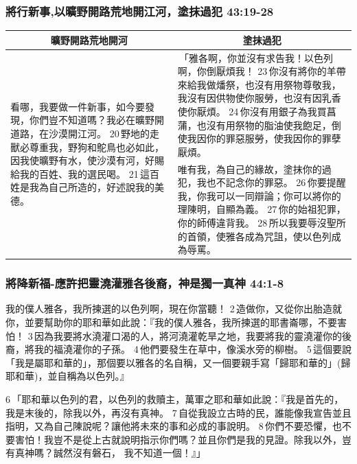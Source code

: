 \subsubsection{將行新事,以曠野開路荒地開江河，塗抹過犯 43:19-28}
\begin{table}[H]
\centering
\begin{tabular}{p{5.75cm}|p{11.50cm}}\hline\hline
\multicolumn{1}{c|}{曠野開路荒地開河}&\multicolumn{1}{c}{塗抹過犯}\\\hline
\multirow{2}{6.cm}{看哪，我要做一件新事，如今要發現，你們豈不知道嗎？我必在曠野開道路，在沙漠開江河。 20 野地的走獸必尊重我，野狗和鴕鳥也必如此，因我使曠野有水，使沙漠有河，好賜給我的百姓、我的選民喝。 21 這百姓是我為自己所造的，好述說我的美德。}
& 「雅各啊，你並沒有求告我！以色列啊，你倒厭煩我！ 23 你沒有將你的羊帶來給我做燔祭，也沒有用祭物尊敬我，我沒有因供物使你服勞，也沒有因乳香使你厭煩。 24 你沒有用銀子為我買菖蒲，也沒有用祭物的脂油使我飽足，倒使我因你的罪惡服勞，使我因你的罪孽厭煩。\\\cline{2-2}
&唯有我，為自己的緣故，塗抹你的過犯，我也不記念你的罪惡。 26 你要提醒我，你我可以一同辯論；你可以將你的理陳明，自顯為義。 27 你的始祖犯罪，你的師傅違背我。 28 所以我要辱沒聖所的首領，使雅各成為咒詛，使以色列成為辱罵。\\\hline
\end{tabular}
\end{table}




\subsubsection{將降新福-應許把靈澆灌雅各後裔，神是獨一真神 44:1-8}
我的僕人雅各，我所揀選的以色列啊，現在你當聽！ 2 造做你，又從你出胎造就你，並要幫助你的耶和華如此說：『我的僕人雅各，我所揀選的耶書崙哪，不要害怕！ 3 因為我要將水澆灌口渴的人，將河澆灌乾旱之地，我要將我的靈澆灌你的後裔，將我的福澆灌你的子孫。 4 他們要發生在草中，像溪水旁的柳樹。 5 這個要說「我是屬耶和華的」，那個要以雅各的名自稱，又一個要親手寫「歸耶和華的」(歸耶和華)，並自稱為以色列。』


6 「耶和華以色列的君，以色列的救贖主，萬軍之耶和華如此說：『我是首先的，我是末後的，除我以外，再沒有真神。 7 自從我設立古時的民，誰能像我宣告並且指明，又為自己陳說呢？讓他將未來的事和必成的事說明。 8 你們不要恐懼，也不要害怕！我豈不是從上古就說明指示你們嗎？並且你們是我的見證。除我以外，豈有真神嗎？誠然沒有磐石，
我不知道一個！』」

